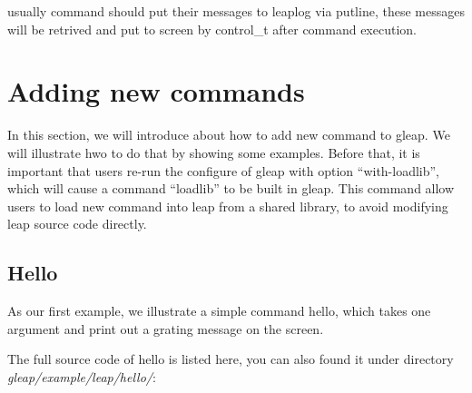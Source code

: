 \documentclass[letterpaper]{book}
\begin{document}
usually command should put their messages to leaplog via putline, these messages will be retrived
and put to screen by control\_t after command execution.

\section{Adding new commands}

  In this section, we will introduce about how to add new command to gleap. We will illustrate
hwo to do that by showing some examples. Before that, it is important that users re-run the 
configure of gleap with option ``with-loadlib'', which will cause a command ``loadlib'' to be 
built in gleap. This command allow users to load new command into leap from a shared library,
to avoid modifying leap source code directly.

 
\subsection{Hello}

  As our first example, we illustrate a simple command hello, which takes one argument and print
out a grating message on the screen.


  The full source code of hello is listed here, you can also found it under directory 
{\it gleap/example/leap/hello/}:
\end{document}

